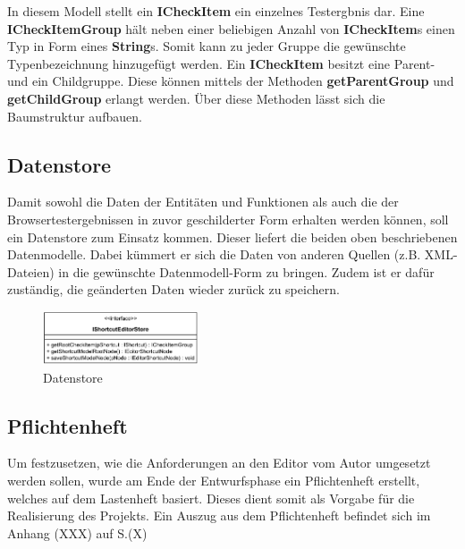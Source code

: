 In diesem Modell stellt ein \textbf{ICheckItem} ein einzelnes Testergbnis dar. Eine \textbf{ICheckItemGroup} hält neben einer beliebigen Anzahl von \textbf{ICheckItem}s einen Typ in Form eines \textbf{String}s. Somit kann zu jeder Gruppe die gewünschte Typenbezeichnung hinzugefügt werden. Ein \textbf{ICheckItem} besitzt eine Parent- und ein Childgruppe. Diese können mittels der Methoden \textbf{getParentGroup} und \textbf{getChildGroup} erlangt werden. Über diese Methoden lässt sich die Baumstruktur aufbauen.

\vspace{-5px}

\subsection{Datenstore}

Damit sowohl die Daten der Entitäten und Funktionen als auch die der Browsertestergebnissen in zuvor geschilderter Form erhalten werden können, soll ein Datenstore zum Einsatz kommen. Dieser liefert die beiden oben beschriebenen Datenmodelle. Dabei kümmert er sich die Daten von anderen Quellen (z.B. XML-Dateien) in die gewünschte Datenmodell-Form zu bringen. Zudem ist er dafür zuständig, die geänderten Daten wieder zurück zu speichern.

\vspace{-2px}

\begin{figure}[H]
	\centering
	\includegraphics[height=60px]{../graphic/diagrams/CD_IShortcutEditorStore/IShortcutEditorStore}
	\caption{Datenstore}
	\label{fig:ishortcuteditorstore}
\end{figure}

\vspace{-32px}

\subsection{Pflichtenheft}

Um festzusetzen, wie die Anforderungen an den Editor vom Autor umgesetzt werden sollen, wurde am Ende der Entwurfsphase ein Pflichtenheft erstellt, welches auf dem Lastenheft basiert. Dieses dient somit als Vorgabe für die Realisierung des Projekts. Ein Auszug aus dem Pflichtenheft befindet sich im Anhang (XXX) auf S.(X)



\newpage